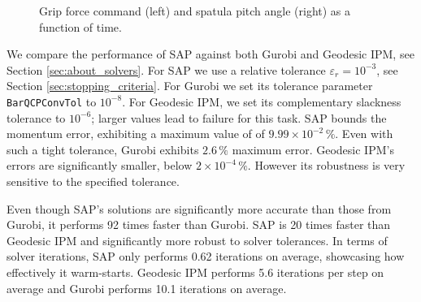 \begin{figure}[!h]
	\centering
	\caption{\label{fig:slip_control_history} 
	Grip force command (left) and spatula pitch angle (right) as a function of
	time.}
\end{figure}

We compare the performance of SAP against both Gurobi and Geodesic IPM, see
Section \ref{sec:about_solvers}. For SAP we use a relative tolerance
$\varepsilon_r=10^{-3}$, see Section \ref{sec:stopping_criteria}. For Gurobi we
set its tolerance parameter \verb+BarQCPConvTol+ to $10^{-8}$. For Geodesic IPM,
we set its complementary slackness tolerance to $10^{-6}$; larger values lead to
failure for this task. SAP bounds the momentum error, exhibiting a maximum value
of of $9.99\times 10^{-2}\,\%$. Even with such a tight tolerance, Gurobi
exhibits $2.6\,\%$ maximum error. Geodesic IPM's errors are significantly
smaller, below $2\times 10^{-4}\,\%$. However its robustness is very sensitive
to the specified tolerance.

Even though SAP's solutions are significantly more accurate than those from
Gurobi, it performs 92 times faster than Gurobi. SAP is 20 times faster than
Geodesic IPM and significantly more robust to solver tolerances. In terms of
solver iterations, SAP only performs 0.62 iterations on average, showcasing how
effectively it warm-starts. Geodesic IPM performs 5.6 iterations per step on
average and Gurobi performs 10.1 iterations on average.
